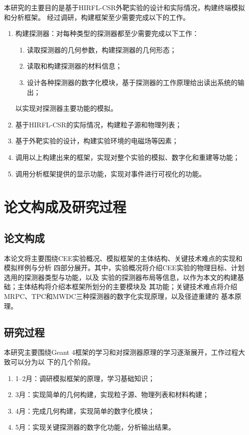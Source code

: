 \documentclass[bachelor,openany,oneside,color]{buaathesis}
\begin{document}
本研究的主要目的是基于HIRFL-CSR外靶实验的设计和实际情况，构建终端模拟和分析框架。
经过调研，构建框架至少需要完成以下的工作。
\begin{enumerate}
	\item 构建探测器：对每种类型的探测器都至少需要完成以下工作：
	\begin{enumerate}
		\item 读取探测器的几何参数，构建探测器的几何形态；
		\item 读取和构建探测器的材料信息；
		\item 设计各种探测器的数字化模块，基于探测器的工作原理给出读出系统的输出；
	\end{enumerate}
		以实现对探测器主要功能的模拟。
	\item 基于HIRFL-CSR的实际情况，构建粒子源和物理列表；
	\item 基于外靶实验的设计，构建实验环境的电磁场等因素；
	\item 调用以上构建出来的框架，实现对整个实验的模拟、数字化和重建等功能；
	\item 调用分析框架提供的显示功能，实现对事件进行可视化的功能。
\end{enumerate}

\section{论文构成及研究过程}

\subsection{论文构成}

本论文将主要围绕CEE实验概况、模拟框架的主体结构、关键技术难点的实现和模拟样例与分析
四部分展开。其中，实验概况将介绍CEE实验的物理目标、计划选用的探测器类型与功能，以及
实验的探测器布局等信息，以作为本文的构建基础；主体结构将介绍本框架所划分的主要模块及
其功能；关键技术难点将介绍MRPC、TPC和MWDC三种探测器的数字化实现原理，以及径迹重建的
基本原理。

\subsection{研究过程}

本研究主要围绕Geant 4框架的学习和对探测器原理的学习逐渐展开，工作过程大致可以分为以
下的几个阶段。
\begin{enumerate}
	\item 1--2月：调研模拟框架的原理，学习基础知识；
	\item 3月：实现简单的几何构建，实现粒子源、物理列表和材料构建；
	\item 4月：完成几何构建，实现简单的数字化模块；
	\item 5月：实现关键探测器的数字化功能，分析输出结果。
\end{enumerate}
\end{document}

